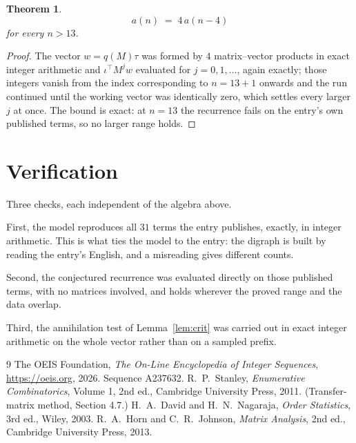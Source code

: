 \documentclass[11pt,a4paper]{article}
\theoremstyle{plain}
\newtheorem{theorem}{Theorem}
\theoremstyle{definition}
\begin{document}
\begin{theorem}
\[
a(n)\;=\;4\,a(n-4)
\]
for every $n>13$.
\end{theorem}

\begin{proof}
The vector $w=q(M)\tau$ was formed by $4$ matrix--vector products in exact integer
arithmetic and $\iota^{\!\top}M^{j}w$ evaluated for $j=0,1,\dots$, again exactly; those
integers vanish from the index corresponding to $n=13+1$ onwards and the run continued
until the working vector was identically zero, which settles every larger $j$ at once. The bound is exact: at $n=13$ the recurrence fails on the entry's own published terms, so no larger range holds.
\end{proof}

\section{Verification}

Three checks, each independent of the algebra above.

First, the model reproduces all $31$ terms the entry publishes, exactly, in integer
arithmetic. This is what ties the model to the entry: the digraph is built by reading the
entry's English, and a misreading gives different counts.

Second, the conjectured recurrence was evaluated directly on those published terms, with no
matrices involved, and holds wherever the proved range and the data overlap.

Third, the annihilation test of Lemma~\ref{lem:crit} was carried out in exact integer
arithmetic on the whole vector rather than on a sampled prefix.

\begin{thebibliography}{9}
 The OEIS Foundation, \emph{The On-Line Encyclopedia of Integer
Sequences}, \url{https://oeis.org}, 2026. Sequence A237632.
 R.~P.~Stanley, \emph{Enumerative Combinatorics}, Volume 1, 2nd ed.,
Cambridge University Press, 2011. (Transfer-matrix method, Section 4.7.)
 H.~A.~David and H.~N.~Nagaraja, \emph{Order Statistics}, 3rd ed., Wiley,
2003.
 R.~A.~Horn and C.~R.~Johnson, \emph{Matrix Analysis}, 2nd ed., Cambridge
University Press, 2013.
\end{thebibliography}
\end{document}
